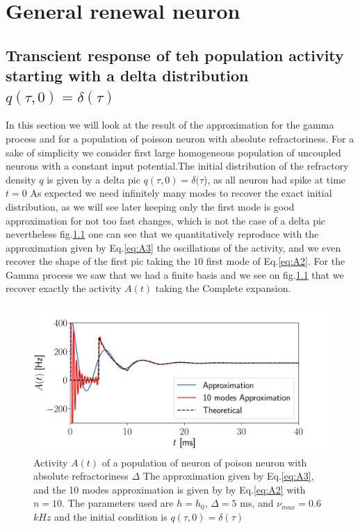 \documentclass[a4paper,11pt,twoside]{article}
\numberwithin{equation}{section}
\begin{document}
 


\FloatBarrier
\chapter{General renewal neuron}
\section{Transcient response of teh population activity starting with a delta distribution $q(\tau,0)=\delta(\tau)$}


In this section we will look at the result of the approximation for the gamma process and for a population of poisson neuron with absolute refractoriness. For a sake of simplicity we consider first  large homogeneous population of uncoupled neurons with a constant input potential.The initial distribution of the refractory density $q$ is given by a delta pic $q(\tau,0)=\delta(\tau$), as all neuron had spike at time $t=0$
As expected we need infinitely many modes to recover the exact initial distribution, as we will see later keeping only the first mode is good approximation for not too fast changes, which is not the case of a delta pic nevertheless  fig.\ref{fig:delta_poisson} one can see that we quantitatively reproduce with the approximation given by Eq.\eqref{eq:A3} the oscillations of the activity, and we even recover the shape of the first pic taking the $10$ first mode of Eq.\eqref{eq:A2}.
 For the Gamma process we saw that we had a finite basis and we see on fig.\ref{fig:delta_poisson} that we recover exactly the activity $A(t)$ taking the Complete expansion.



\begin{figure}[h!]
	\centering
	\includegraphics[width=0.8\linewidth]{delta_poisson.pdf}
	\caption{Activity $A(t)$ of a population of neuron of poison neuron with absolute refractoriness $\Delta$ The approximation given by Eq.\eqref{eq:A3}, and the 10 modes approximation is given by  by Eq.\ref{eq:A2} with $n=10$. The parameters used are $h=h_0$, $\Delta=5$ ms, and $\nu_{max}=0.6$ $kHz$  and the initial condition is $q(\tau,0)=\delta(\tau)$}
	\label{fig:delta_poisson}
\end{figure}
\end{document}
